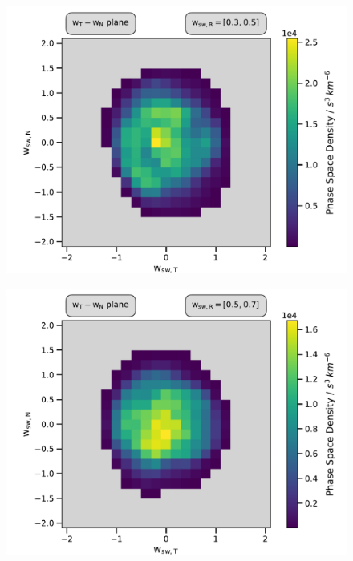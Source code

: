 \documentclass{beamer}
\begin{document}
\begin{frame}[plain]{}
\begin{figure}
	\includegraphics[scale=.6]{Pics/cart_50_ps_R.pdf}
\end{figure}
\end{frame}

\begin{frame}[plain]{}
\begin{figure}
	\includegraphics[scale=.6]{Pics/cart_50_R_step1.pdf}
\end{figure}
\end{frame}
\end{document}
